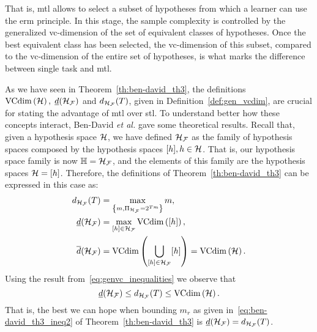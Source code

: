 That is, \acrshort{mtl} allows to select a subset of hypotheses from which a learner can use the \acrshort{erm} principle. In this stage, the sample complexity is controlled by the generalized \acrshort{vc}-dimension of the set of equivalent classes of hypotheses. Once the best equivalent class has been selected, 
the \acrshort{vc}-dimension of this subset, compared to the \acrshort{vc}-dimension of the entire set of hypotheses, is what marks the difference between single task and \acrshort{mtl}.

As we have seen in Theorem~\ref{th:ben-david_th3}, the definitions $\operatorname{VCdim}\left(\mathcal{H}\right),\; \underline{d}(\mathcal{H}_{\mathcal{F}})$ and $d_{\mathcal{H}_{\mathcal{F}}}(T)$, given in Definition~\ref{def:gen_vcdim}, are crucial for stating the advantage of \acrshort{mtl} over \acrshort{stl}. 
To understand better how these concepts interact, Ben-David \emph{et al.} gave some theoretical results.
Recall that, given a hypothesis space $\mathcal{H}$, we have defined $\mathcal{H}_{\mathcal{F}}$ as the family of hypothesis spaces composed by the hypothesis spaces $\lbrack h\rbrack, h \in \mathcal{H}$.
That is, our hypothesis space family is now $\mathbb{H} = \mathcal{H}_{\mathcal{F}}$, and the elements of this family are the hypothesis spaces $\mathcal{H} = \lbrack h\rbrack$. Therefore, the definitions of Theorem~\ref{th:ben-david_th3} can be expressed in this case as:
\begin{align*}
    \nonumber
    d_{\mathcal{H}_{\mathcal{F}}}(T) &= \max_{\left\{m ,\Pi_{\mathcal{H}_{\mathcal{F}}} = 2^{T m}\right\} } m, \\
    \underline{d}(\mathcal{H}_{\mathcal{F}}) &= \max_{\lbrack h\rbrack \in \mathcal{H}_{\mathcal{F}}} \operatorname{VCdim}\left(\lbrack h\rbrack\right), \\    
    \overline{d}(\mathcal{H}_{\mathcal{F}}) &= \operatorname{VCdim}\left(\bigcup_{\lbrack h\rbrack \in \mathcal{H}_{\mathcal{F}}} \lbrack h\rbrack\right)= \operatorname{VCdim}\left(\mathcal{H}\right).
\end{align*}
Using the result from~\eqref{eq:genvc_inequalities} we observe that
\begin{equation}
    \nonumber
    \underline{d}(\mathcal{H}_{\mathcal{F}}) \leq d_{\mathcal{H}_{\mathcal{F}}}(T) \leq \operatorname{VCdim}\left(\mathcal{H}\right) .
\end{equation}
That is, the best we can hope when bounding $m_r$ as given in~\eqref{eq:ben-david_th3_ineq2} of Theorem~\ref{th:ben-david_th3} is $\underline{d}(\mathcal{H}_{\mathcal{F}}) = d_{\mathcal{H}_{\mathcal{F}}}(T)$. 
